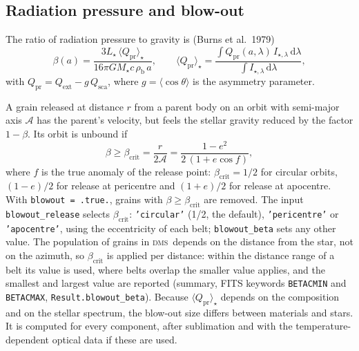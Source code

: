 \documentclass[11pt,a4paper]{article}
\newcommand{\dms}{\textsc{dms}}
\newcommand{\code}[1]{\texttt{#1}}
\newcommand{\dd}{\mathrm{d}}
\begin{document}
\subsection{Radiation pressure and blow-out}
\label{sec:beta}

The ratio of radiation pressure to gravity is (Burns et al.\ 1979)
\begin{equation}
\beta(a) = \frac{3L_\star\,\langle Q_\mathrm{pr}\rangle_\star}{16\pi G M_\star c\,\rho_\mathrm{b}\,a},
\qquad
\langle Q_\mathrm{pr}\rangle_\star = \frac{\int Q_\mathrm{pr}(a,\lambda)\,I_{\star,\lambda}\,\dd\lambda}
                                         {\int I_{\star,\lambda}\,\dd\lambda},
\end{equation}
with $Q_\mathrm{pr}=Q_\mathrm{ext}-g\,Q_\mathrm{sca}$, where $g=\langle\cos\theta\rangle$ is the
asymmetry parameter.

A grain released at distance $r$ from a parent body on an orbit with semi-major axis $\mathcal{A}$
has the parent's velocity, but feels the stellar gravity reduced by the factor $1-\beta$. Its orbit
is unbound if
\begin{equation}
\beta \ge \beta_\mathrm{crit} = \frac{r}{2\mathcal{A}} = \frac{1-e^2}{2\,(1+e\cos f)},
\label{eq:betacrit}
\end{equation}
where $f$ is the true anomaly of the release point: $\beta_\mathrm{crit}=1/2$ for circular orbits,
$(1-e)/2$ for release at pericentre and $(1+e)/2$ for release at apocentre. With
\code{blowout = .true.}, grains with $\beta\ge\beta_\mathrm{crit}$ are removed. The input
\code{blowout\_release} selects $\beta_\mathrm{crit}$: \code{'circular'} (1/2, the default),
\code{'pericentre'} or \code{'apocentre'}, using the eccentricity of each belt; \code{blowout\_beta}
sets any other value. The population of grains in \dms\ depends on the distance from the star, not
on the azimuth, so $\beta_\mathrm{crit}$ is applied per distance: within the distance range of a
belt its value is used, where belts overlap the smaller value applies, and the smallest and largest
value are reported (summary, FITS keywords \code{BETACMIN} and \code{BETACMAX},
\code{Result.blowout\_beta}). Because $\langle Q_\mathrm{pr}\rangle_\star$ depends on the composition and on the stellar
spectrum, the blow-out size differs between materials and stars. It is computed for every
component, after sublimation and with the temperature-dependent optical data if these are used.

\end{document}
